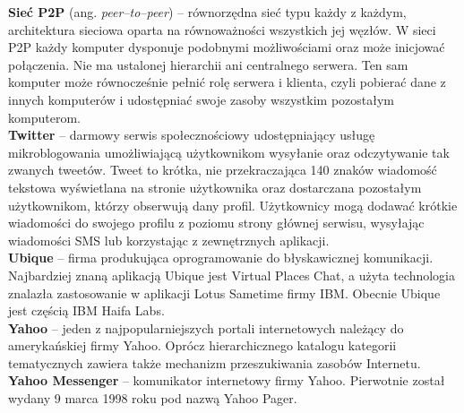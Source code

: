 \documentclass[a4paper,12pt]{article}
\begin{document}
\noindent\textbf{Sieć P2P} (ang. \textit{peer--to--peer}) -- równorzędna sieć typu każdy z każdym, architektura sieciowa oparta na równoważności wszystkich jej węzłów. W sieci P2P każdy komputer dysponuje podobnymi możliwościami oraz może inicjować połączenia. Nie ma ustalonej hierarchii ani centralnego serwera. Ten sam komputer może równocześnie pełnić rolę serwera i klienta, czyli pobierać dane z innych komputerów i udostępniać swoje zasoby wszystkim pozostałym komputerom.\\

\noindent\textbf{Twitter} -- darmowy serwis społecznościowy udostępniający usługę mikroblogowania umożliwiającą użytkownikom wysyłanie oraz odczytywanie tak zwanych tweetów. Tweet to krótka, nie przekraczająca 140 znaków wiadomość tekstowa wyświetlana na stronie użytkownika oraz dostarczana pozostałym użytkownikom, którzy obserwują dany profil. Użytkownicy mogą dodawać krótkie wiadomości do swojego profilu z poziomu strony głównej serwisu, wysyłając wiadomości SMS lub korzystając z zewnętrznych aplikacji.\\

\noindent\textbf{Ubique} -- firma produkująca oprogramowanie do błyskawicznej komunikacji. Najbardziej znaną aplikacją Ubique jest Virtual Places Chat, a użyta technologia znalazła zastosowanie w aplikacji Lotus Sametime firmy IBM. Obecnie Ubique jest częścią IBM Haifa Labs.\\

\noindent\textbf{Yahoo} -- jeden z najpopularniejszych portali internetowych należący do amerykańskiej firmy Yahoo. Oprócz hierarchicznego katalogu kategorii tematycznych zawiera także mechanizm przeszukiwania zasobów Internetu.\\

\noindent\textbf{Yahoo Messenger} -- komunikator internetowy firmy Yahoo. Pierwotnie został wydany 9 marca 1998 roku pod nazwą Yahoo Pager.\\
\end{document}
